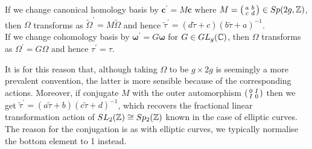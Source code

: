 \documentclass{article}
\begin{document}
\begin{lemma}
	If we change canonical homology basis by $\bm{c}^\prime = M \bm{c}$ where $M = \begin{psmallmatrix} a & b \\ c & d \end{psmallmatrix} \in Sp(2g,\mathbb{Z})$, then $\Omega$ transforms as $\tilde{\Omega}^\prime = M\tilde{\Omega}$ and hence $\tilde{\tau}^\prime = (d\tilde{\tau}+c)(b\tilde{\tau}+a)^{-1}$. \\
	If we change cohomology basis by $\bm{\omega}^\prime = G \bm{\omega}$ for $G \in GL_g(\mathbb{C})$, then $\Omega$ transforms as $\Omega^\prime = G\Omega$ and hence $\tau^\prime = \tau$.   
\end{lemma}
\begin{remark}
	It is for this reason that, although taking $\Omega$ to be $g \times 2g$ is seemingly a more prevalent convention, the latter is more sensible because of the corresponding actions. Moreover, if conjugate $M$ with the outer automorphism $\begin{psmallmatrix} 0 & I \\ I & 0 \end{psmallmatrix}$ then we get $\tilde{\tau}^\prime = (a\tilde{\tau}+b)(c\tilde{\tau}+d)^{-1}$, which recovers the fractional linear transformation action of $SL_2(\mathbb{Z}) \cong Sp_2(\mathbb{Z})$ known in the case of elliptic curves. The reason for the conjugation is as with elliptic curves, we typically normalise the bottom element to 1 instead. 
\end{remark}

\end{document}
